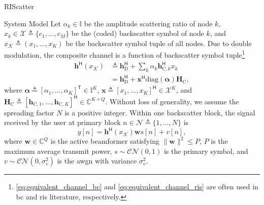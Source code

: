 \documentclass[journal]{IEEEtran}
\begin{document}
\begin{section}{RIScatter}
\begin{subsection}{System Model}
		Let $\alpha_k \in \mathbb{I}$ be the amplitude scattering ratio of node $k$, $x_k \in \mathcal{X} \triangleq \{c_1,\ldots,c_M\}$ be the (coded) backscatter symbol of node $k$, and $x_{\mathcal{K}} \triangleq (x_1,\ldots,x_K)$ be the backscatter symbol tuple of all nodes.
		Due to double modulation, the composite channel is a function of backscatter symbol tuple\footnote{\eqref{eq:equivalent_channel_bc} and \eqref{eq:equivalent_channel_ris} are often used in \gls{bc} and \gls{ris} literature, respectively.}
		\begin{subequations}
			\label{eq:equivalent_channel}
			\begin{align}
				\boldsymbol{h}^\mathsf{H}(x_{\mathcal{K}})
				 & \triangleq \boldsymbol{h}_{\text{D}}^\mathsf{H} + \sum_{k} \alpha_k \boldsymbol{h}_{\text{C},k}^\mathsf{H} x_k \label{eq:equivalent_channel_bc}                    \\
				 & = \boldsymbol{h}_{\text{D}}^\mathsf{H} + \boldsymbol{x}^\mathsf{H} \mathrm{diag}(\boldsymbol{\alpha}) \boldsymbol{H}_{\text{C}}, \label{eq:equivalent_channel_ris}
			\end{align}
		\end{subequations}
		where $\boldsymbol{\alpha} \triangleq [\alpha_1,\ldots,\alpha_K]^\mathsf{T} \in \mathbb{I}^{K}$, $\boldsymbol{x} \triangleq [x_1,\ldots,x_K]^\mathsf{H} \in \mathcal{X}^{K}$, and $\boldsymbol{H}_{\text{C}} \triangleq [\boldsymbol{h}_{\text{C},1},\ldots,\boldsymbol{h}_{\text{C},K}]^\mathsf{H} \in \mathbb{C}^{K \times Q}$.
		Without loss of generality, we assume the spreading factor $N$ is a positive integer.
		Within one backscatter block, the signal received by the user at primary block $n \in \mathcal{N} \triangleq \{1,\ldots,N\}$ is
		\begin{equation}
			y[n] = \boldsymbol{h}^\mathsf{H}(x_{\mathcal{K}}) \boldsymbol{w} s[n] + v[n],
			\label{eq:receive_signal}
		\end{equation}
		where $\boldsymbol{w} \in \mathbb{C}^{Q}$ is the active beamformer satisfying $\lVert \boldsymbol{w} \rVert^2 \le P$, $P$ is the maximum average transmit power, $s \sim \mathcal{CN}(0,1)$ is the primary symbol, and $v \sim \mathcal{CN}(0,\sigma_v^2)$ is the \gls{awgn} with variance $\sigma_v^2$.


\end{subsection}
\end{section}
\end{document}
